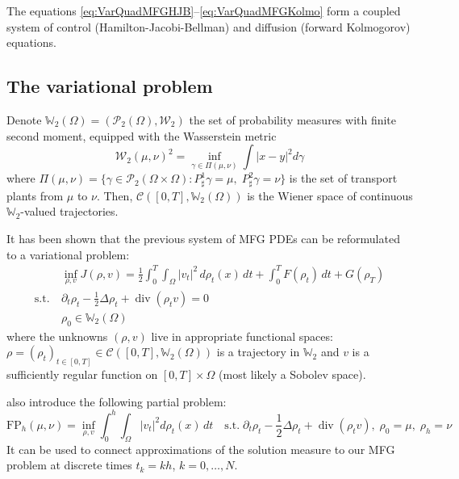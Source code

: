 \documentclass{article}
\newcommand{\WW}{\mathbb{W}}
\newcommand{\calC}{\mathcal{C}}
\newcommand{\calP}{\mathcal{P}}
\newcommand{\calW}{\mathcal{W}}
\newcommand{\suchthat}{\mathrm{s.t.}}
\DeclareMathOperator{\divg}{div}
\begin{document}
    The equations \eqref{eq:VarQuadMFGHJB}--\eqref{eq:VarQuadMFGKolmo} form a coupled system of control (Hamilton-Jacobi-Bellman) and diffusion (forward Kolmogorov) equations.
    
    \subsection{The variational problem}
    
    Denote $\WW_2(\Omega) = (\calP_2(\Omega), \calW_2)$ the set of probability measures with finite second moment, equipped with the Wasserstein metric
    \begin{equation}\label{eq:Wasserstein2Metric}
    	\calW_2(\mu,\nu)^2 = \inf_{\gamma\in\Pi(\mu,\nu)}
    	\int {|x-y|}^2 d\gamma
    \end{equation}
    where $\Pi(\mu,\nu) =\{ \gamma \in \calP_2(\Omega\times\Omega) : P^1_{\sharp}\gamma = \mu,\; P^2_{\sharp}\gamma = \nu \}$ is the set of transport plants from $\mu$ to $\nu$.
    Then, $\mathcal{C}([0, T], \WW_2(\Omega))$ is the Wiener space of continuous $\WW_2$-valued trajectories.
    
    It has been shown \cite{benamou:hal-01295299} that the previous system of MFG PDEs can be reformulated to a variational problem:
    \begin{subequations}\label{eq:EulerianProblem}
    \begin{align}
    	&\inf_{\rho,v} J(\rho, v) =
    	\frac{1}{2}\int_0^T\int_\Omega |v_t|^2 \,d\rho_t(x)\,dt + \int_0^T F(\rho_t)\,dt + G(\rho_T)
    	\\
    	\suchthat\ &\partial_t \rho_t - \frac12\Delta \rho_t + \divg(\rho_t v) = 0 \\
    	&\rho_0 \in \WW_2(\Omega)	
    \end{align}
	\end{subequations}
	where the unknowns $(\rho, v)$ live in appropriate functional spaces: $\rho = (\rho_t)_{t\in[0,T]}\in \calC([0,T], \WW_2(\Omega))$ is a trajectory in $\WW_2$ and $v$ is a sufficiently regular function on $[0,T] \times \Omega$ (most likely a Sobolev space).
	
	\textcite{benamou2018entropy} also introduce the following partial problem:
	\begin{equation}\label{eq:FPhPartial}
		\mathrm{FP}_h(\mu,\nu) =
		\inf_{\rho, v} \int_0^h\int_\Omega |v_t|^2 d\rho_t(x)\,dt
		\quad \suchthat\;
		\partial_t\rho_t -\frac12\Delta\rho_t + \divg(\rho_tv),\;
		\rho_0 = \mu,\; \rho_h = \nu
	\end{equation}
	It can be used to connect approximations of the solution measure to our MFG problem at discrete times $t_k = kh$, $k=0,\ldots,N$.
	
\end{document}

